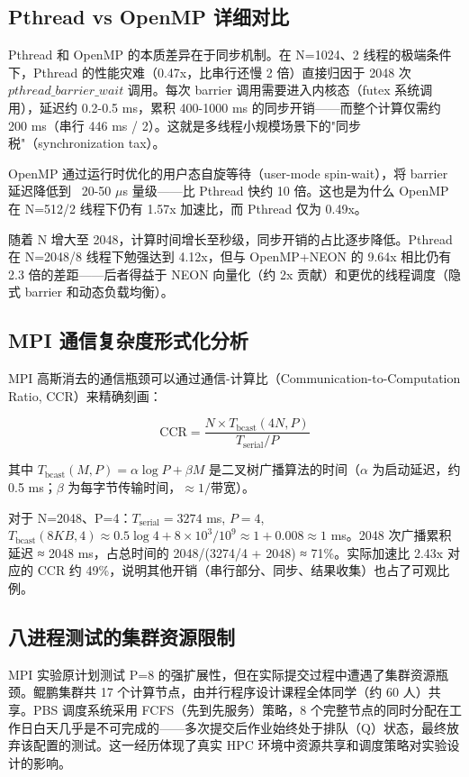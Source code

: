 \documentclass[a4paper]{article}
\begin{document}
\subsection{Pthread vs OpenMP 详细对比}

Pthread 和 OpenMP 的本质差异在于同步机制。在 N=1024、2 线程的极端条件下，Pthread 的性能灾难（0.47x，比串行还慢 2 倍）直接归因于 2048 次 $pthread\_barrier\_wait$ 调用。每次 barrier 调用需要进入内核态（futex 系统调用），延迟约 0.2-0.5 ms，累积 400-1000 ms 的同步开销——而整个计算仅需约 200 ms（串行 446 ms / 2）。这就是多线程小规模场景下的"同步税"（synchronization tax）。

OpenMP 通过运行时优化的用户态自旋等待（user-mode spin-wait），将 barrier 延迟降低到 ~20-50 $\mu$s 量级——比 Pthread 快约 10 倍。这也是为什么 OpenMP 在 N=512/2 线程下仍有 1.57x 加速比，而 Pthread 仅为 0.49x。

随着 N 增大至 2048，计算时间增长至秒级，同步开销的占比逐步降低。Pthread 在 N=2048/8 线程下勉强达到 4.12x，但与 OpenMP+NEON 的 9.64x 相比仍有 2.3 倍的差距——后者得益于 NEON 向量化（约 2x 贡献）和更优的线程调度（隐式 barrier 和动态负载均衡）。

\subsection{MPI 通信复杂度形式化分析}

MPI 高斯消去的通信瓶颈可以通过通信-计算比（Communication-to-Computation Ratio, CCR）来精确刻画：

\begin{equation}
\text{CCR} = \frac{N \times T_{\text{bcast}}(4N, P)}{T_{\text{serial}} / P}
\end{equation}

其中 $T_{\text{bcast}}(M, P) = \alpha \log P + \beta M$ 是二叉树广播算法的时间（$\alpha$ 为启动延迟，约 0.5 ms；$\beta$ 为每字节传输时间，$\approx 1/带宽$）。

对于 N=2048、P=4：$T_{\text{serial}} = 3274$ ms, $P = 4$, $T_{\text{bcast}}(8KB, 4) \approx 0.5 \log 4 + 8 \times 10^3 / 10^9 \approx 1 + 0.008 \approx 1$ ms。2048 次广播累积延迟 ≈ 2048 ms，占总时间的 2048/(3274/4 + 2048) ≈ 71\%。实际加速比 2.43x 对应的 CCR 约 49\%，说明其他开销（串行部分、同步、结果收集）也占了可观比例。

\subsection{八进程测试的集群资源限制}

MPI 实验原计划测试 P=8 的强扩展性，但在实际提交过程中遭遇了集群资源瓶颈。鲲鹏集群共 17 个计算节点，由并行程序设计课程全体同学（约 60 人）共享。PBS 调度系统采用 FCFS（先到先服务）策略，8 个完整节点的同时分配在工作日白天几乎是不可完成的——多次提交后作业始终处于排队（Q）状态，最终放弃该配置的测试。这一经历体现了真实 HPC 环境中资源共享和调度策略对实验设计的影响。
\end{document}
